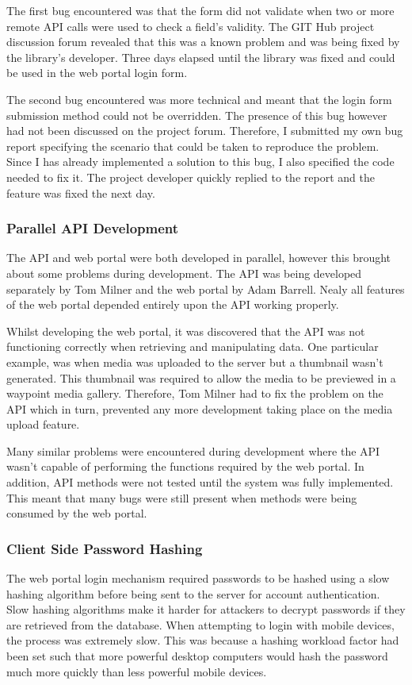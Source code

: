 \documentclass[11pt,a4paper]{report}
\begin{document}
The first bug encountered was that the form did not validate when two or more remote API calls were used to check a field's validity. The GIT Hub project discussion forum revealed that this was a known problem and was being fixed by the library's developer. Three days elapsed until the library was fixed and could be used in the web portal login form.

The second bug encountered was more technical and meant that the login form submission method could not be overridden. The presence of this bug however had not been discussed on the project forum. Therefore, I submitted my own bug report specifying the scenario that could be taken to reproduce the problem. Since I has already implemented a solution to this bug, I also specified the code needed to fix it. The project developer quickly replied to the report and the feature was fixed the next day.

\subsubsection{Parallel API Development}
The API and web portal were both developed in parallel, however this brought about some problems during development. The API was being developed separately by Tom Milner and the web portal by Adam Barrell. Nealy all features of the web portal depended entirely upon the API working properly.

Whilst developing the web portal, it was discovered that the API was not functioning correctly when retrieving and manipulating data. One particular example, was when media was uploaded to the server but a thumbnail wasn't generated. This thumbnail was required to allow the media to be previewed in a waypoint media gallery. Therefore, Tom Milner had to fix the problem on the API which in turn, prevented any more development taking place on the media upload feature.

Many similar problems were encountered during development where the API wasn't capable of performing the functions required by the web portal. In addition, API methods were not tested until the system was fully implemented. This meant that many bugs were still present when methods were being consumed by the web portal.

\subsubsection{Client Side Password Hashing}
The web portal login mechanism required passwords to be hashed using a slow hashing algorithm before being sent to the server for account authentication. Slow hashing algorithms make it harder for attackers to decrypt passwords if they are retrieved from the database. When attempting to login with mobile devices, the process was extremely slow. This was because a hashing workload factor had been set such that more powerful desktop computers would hash the password much more quickly than less powerful mobile devices.
\end{document}
